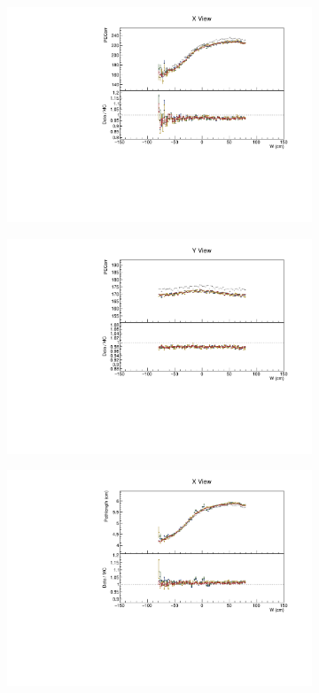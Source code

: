 \documentclass[12pt,a4paper]{article}
\begin{document}
\begin{figure}[!ht]
\begin{subfigure}{0.5\textwidth}
  \end{subfigure}
  \begin{subfigure}{0.5\textwidth}
    \includegraphics[width=\linewidth]{essentialsec_tb/pecorr_w_x.pdf}
  \end{subfigure}
  \begin{subfigure}{0.5\textwidth}
    \includegraphics[width=\linewidth]{essentialsec_tb/pecorr_w_y.pdf}
  \end{subfigure}
  \begin{subfigure}{0.5\textwidth}
    \includegraphics[width=\linewidth]{essentialsec_tb/cm_w_x.pdf}

\end{subfigure}
\end{figure}
\end{document}
